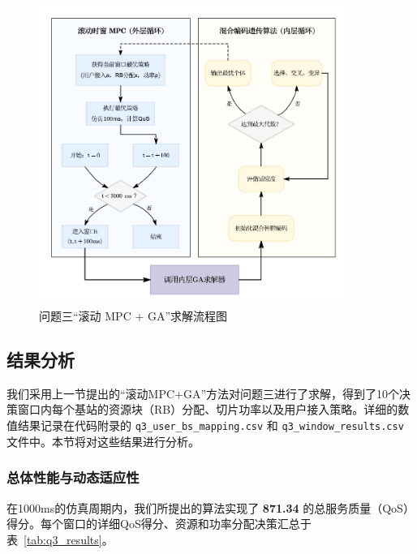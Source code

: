 \begin{figure}[H]
  \centering
  \includegraphics[width=0.9\textwidth]{figures/第三问算法.pdf}
  \caption{问题三“滚动 MPC + GA”求解流程图}
  \label{fig:flow_q3}
\end{figure}

\subsection{结果分析}
我们采用上一节提出的“滚动MPC+GA”方法对问题三进行了求解，得到了10个决策窗口内每个基站的资源块（RB）分配、切片功率以及用户接入策略。详细的数值结果记录在代码附录的 \texttt{q3\_user\_bs\_mapping.csv} 和 \texttt{q3\_window\_results.csv} 文件中。本节将对这些结果进行分析。

\subsubsection{总体性能与动态适应性}
在1000ms的仿真周期内，我们所提出的算法实现了 \textbf{871.34} 的总服务质量（QoS）得分。每个窗口的详细QoS得分、资源和功率分配决策汇总于表~\ref{tab:q3_results}。

